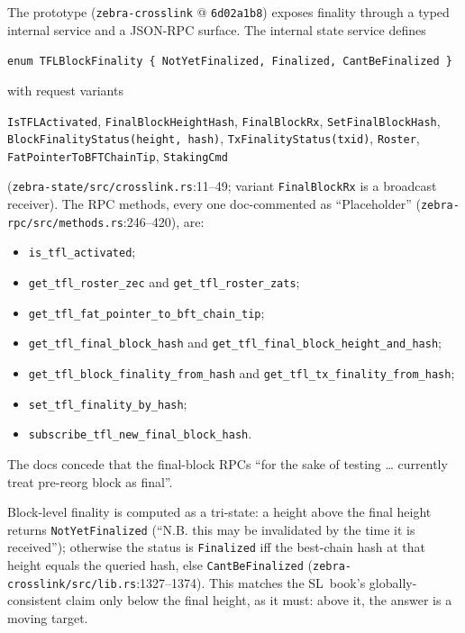 \documentclass[11pt,a4paper]{article}
\theoremstyle{definition}
\begin{document}
The prototype (\texttt{zebra-crosslink} @ \texttt{6d02a1b8}) exposes
finality through a typed internal service and a JSON-RPC surface. The
internal state service defines
\begin{center}
\texttt{enum TFLBlockFinality \{ NotYetFinalized, Finalized,
CantBeFinalized \}}
\end{center}
with request variants
\begin{center}
\texttt{IsTFLActivated}, \texttt{FinalBlockHeightHash},
\texttt{FinalBlockRx}, \texttt{SetFinalBlockHash},\\
\texttt{BlockFinalityStatus(height, hash)},
\texttt{TxFinalityStatus(txid)}, \texttt{Roster},\\
\texttt{FatPointerToBFTChainTip}, \texttt{StakingCmd}
\end{center}
(\texttt{zebra-state/src/crosslink.rs}:11--49; variant
\texttt{FinalBlockRx} is a broadcast receiver). The RPC methods, every
one doc-commented as ``Placeholder''
(\texttt{zebra-rpc/src/methods.rs}:246--420), are:
\begin{itemize}[itemsep=1pt]
\item \texttt{is\_tfl\_activated};
\item \texttt{get\_tfl\_roster\_zec} and \texttt{get\_tfl\_roster\_zats};
\item \texttt{get\_tfl\_fat\_pointer\_to\_bft\_chain\_tip};
\item \texttt{get\_tfl\_final\_block\_hash} and
  \texttt{get\_tfl\_final\_block\_height\_and\_hash};
\item \texttt{get\_tfl\_block\_finality\_from\_hash} and
  \texttt{get\_tfl\_tx\_finality\_from\_hash};
\item \texttt{set\_tfl\_finality\_by\_hash};
\item \texttt{subscribe\_tfl\_new\_final\_block\_hash}.
\end{itemize}
The docs concede that the final-block RPCs ``for the sake of testing
\ldots{} currently treat pre-reorg block as final''.

Block-level finality is computed as a tri-state: a height above the final
height returns \texttt{NotYetFinalized} (``N.B. this may be invalidated by
the time it is received''); otherwise the status is \texttt{Finalized} iff
the best-chain hash at that height equals the queried hash, else
\texttt{CantBeFinalized} (\texttt{zebra-crosslink/src/lib.rs}:1327--1374).
This matches the SL~book's globally-consistent claim only below the final
height, as it must: above it, the answer is a moving target.
\end{document}
